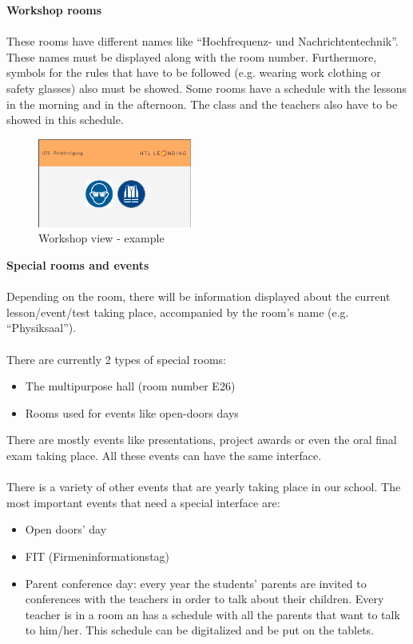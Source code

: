 \documentclass{article}
\newenvironment{explanation}{%
   \color{black}
}{}
\begin{document}
\begin{explanation}
\newpage

\textbf{Workshop rooms} \\
\\
These rooms have different names like “Hochfrequenz- und Nachrichtentechnik”. These names must be displayed along with the room number. Furthermore, symbols for the rules that have to be followed (e.g. wearing work clothing or safety glasses) also must be showed. 
Some rooms have a schedule with the lessons in the morning and in the afternoon. The class and the teachers also have to be showed in this schedule.

\begin{figure}
    \centering
    \includegraphics[width=0.45\textwidth]{images/views_examples/workshop_gebote_beispiel.PNG}
    \caption{Workshop view - example}
\end{figure}
\vspace{0,5 cm}
\textbf{Special rooms and events} \\
\\
Depending on the room, there will be information displayed about the current lesson/event/test taking place, accompanied by the room’s name (e.g. “Physiksaal”).\\
\\
There are currently 2 types of special rooms:
\begin{itemize}
\item The multipurpose hall (room number E26)
\item Rooms used for events like open-doors days
\end{itemize}
There are mostly events like presentations, project awards or even the oral final exam taking place. All these events can have the same interface. \\
\\
There is a variety of other events that are yearly taking place in our school. The most important events that need a special interface are:
\begin{itemize}
\item Open doors’ day
\item FIT (Firmeninformationstag)
\item Parent conference day: every year the students’ parents are invited to conferences with the teachers in order to talk about their children. Every teacher is in a room an has a schedule with all the parents that want to talk to him/her. This schedule can be digitalized and be put on the tablets.
\end{itemize}


\end{explanation}
\end{document}
